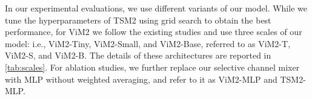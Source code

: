 \documentclass{article}
\newcommand{\head}[1]{\vspace{1.7mm}\noindent{{\textcolor{c1}{\bf #1.}}}}
\begin{document}
\head{ViM2 and TSM2 Models} In our experimental evaluations, we use different variants of our model. While we tune the hyperparameters of TSM2 using grid search to obtain the best performance, for ViM2 we follow the existing studies and use three scales of our model: i.e., ViM2-Tiny, ViM2-Small, and ViM2-Base, referred to as ViM2-T, ViM2-S, and ViM2-B. The details of these architectures are reported in \autoref{tab:scales}. For ablation studies, we further replace our selective channel mixer with MLP without weighted averaging, and refer to it as ViM2-MLP and TSM2-MLP.  


















\newcommand{\blocka}[3]{\multirow{4}{*}{\(\left[\begin{array}{c}
\text{\texttt{Linear} #1 $\rightarrow 2\times$#1}\\[-.1em]
\text{\texttt{DWConv} 3$\times$3, $2\times$#1}\\[-.1em]
\text{\texttt{S6},  $2\times$#1}\\[-.1em]
\text{\texttt{Linear} 2$\times$#1}\\[-.1em]
\end{array}\right]\)$\times$#2}
}

\newcommand{\blockb}[2]{\multirow{4}{*}{\(\left[\begin{array}{c}
\text{\texttt{CW-Linear} #1}\\[-.1em]
\text{\texttt{CW-S6},  #1}\\[-.1em]
\text{\texttt{CW-Linear} #1 }\\[-.1em]
\end{array}\right]\)$\times$#2}
}

\end{document}
